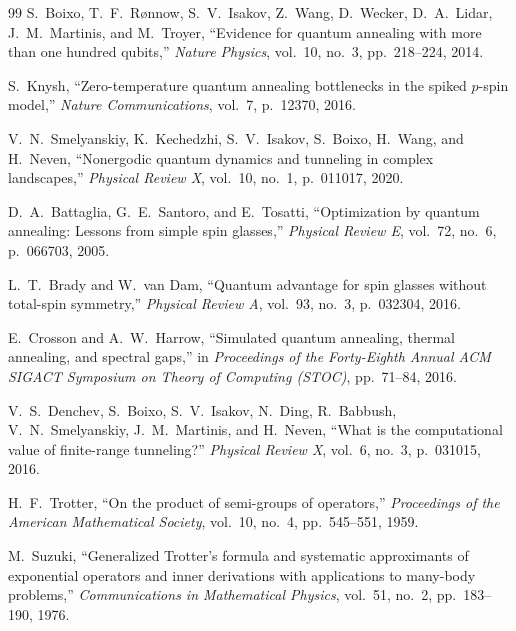\begin{thebibliography}{99}
S.~Boixo, T.~F.~R{\o}nnow, S.~V.~Isakov, Z.~Wang, D.~Wecker, D.~A.~Lidar, J.~M.~Martinis, and M.~Troyer,
``Evidence for quantum annealing with more than one hundred qubits,''
\emph{Nature Physics}, vol.~10, no.~3, pp.~218--224, 2014.

S.~Knysh,
``Zero-temperature quantum annealing bottlenecks in the spiked $p$-spin model,''
\emph{Nature Communications}, vol.~7, p.~12370, 2016.

V.~N.~Smelyanskiy, K.~Kechedzhi, S.~V.~Isakov, S.~Boixo, H.~Wang, and H.~Neven,
``Nonergodic quantum dynamics and tunneling in complex landscapes,''
\emph{Physical Review X}, vol.~10, no.~1, p.~011017, 2020.

D.~A.~Battaglia, G.~E.~Santoro, and E.~Tosatti,
``Optimization by quantum annealing: Lessons from simple spin glasses,''
\emph{Physical Review E}, vol.~72, no.~6, p.~066703, 2005.

L.~T.~Brady and W.~van Dam,
``Quantum advantage for spin glasses without total-spin symmetry,''
\emph{Physical Review A}, vol.~93, no.~3, p.~032304, 2016.

E.~Crosson and A.~W.~Harrow,
``Simulated quantum annealing, thermal annealing, and spectral gaps,''
in \emph{Proceedings of the Forty-Eighth Annual ACM SIGACT Symposium on Theory of Computing (STOC)}, pp.~71--84, 2016.

V.~S.~Denchev, S.~Boixo, S.~V.~Isakov, N.~Ding, R.~Babbush, V.~N.~Smelyanskiy, J.~M.~Martinis, and H.~Neven,
``What is the computational value of finite-range tunneling?''
\emph{Physical Review X}, vol.~6, no.~3, p.~031015, 2016.

H.~F.~Trotter,
``On the product of semi-groups of operators,''
\emph{Proceedings of the American Mathematical Society}, vol.~10, no.~4, pp.~545--551, 1959.

M.~Suzuki,
``Generalized Trotter's formula and systematic approximants of exponential operators and inner derivations with applications to many-body problems,''
\emph{Communications in Mathematical Physics}, vol.~51, no.~2, pp.~183--190, 1976.


\end{thebibliography}
